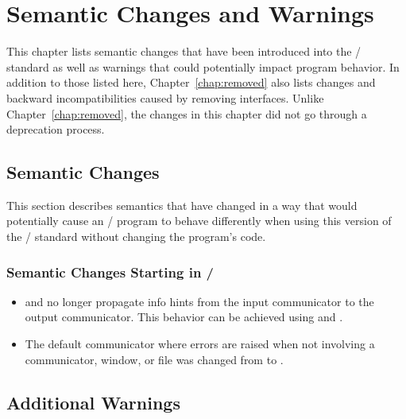 \chapter{Semantic Changes and Warnings}
\label{chap:semantic-changes}

This chapter lists semantic changes that have been introduced into the \MPI/ standard as well as
warnings that could potentially impact program behavior. In addition to those listed here,
Chapter~\ref{chap:removed} also lists changes and backward incompatibilities caused by removing
interfaces. Unlike Chapter~\ref{chap:removed}, the changes in this chapter did not go through a deprecation
process.

\section{Semantic Changes}
\label{sec:semantic-changes:changes}

This section describes semantics that have changed in a way that would potentially cause an \MPI/
program to behave differently when using this version of the \MPI/ standard without changing the program's code.

\subsection{Semantic Changes Starting in \texorpdfstring{\mpiivdoto/}{MPI-4.0}}
\label{subsec:semantic-changes:changes:since40}

\begin{itemize}
\item
{} and  no longer propagate info hints from the input
communicator to the output communicator. This behavior can be achieved using
 and .


\deprecatedsep
\item
The default communicator where errors are raised when not involving a
communicator, window, or file was changed from  to
.

\end{itemize}

\section{Additional Warnings}
\label{sec:semantic-changes:warnings}

